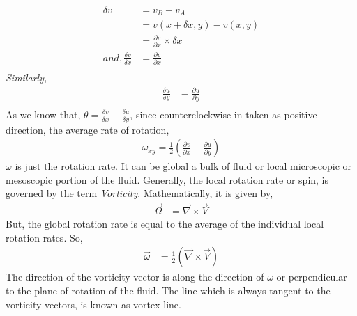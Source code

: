 \documentclass{book}
\begin{document}
\begin{equation*}
\begin{split}
\delta v&=v_B-v_A\\
&=v(x+\delta x,y)-v(x,y)\\
&=\frac{\partial v}{\partial x}\times \delta x\\
and, \frac{\delta v}{\delta x}&=\frac{\partial v}{\partial x}\\
\end{split}
\end{equation*}
\emph{Similarly,}\\
\vspace{0.8cm}
\begin{equation*}
\begin{split}
\frac{\delta u}{\delta y}&=\frac{\partial u}{\partial y}\\
\end{split}
\end{equation*}
As we know that, $\dot{\theta}=\frac{\delta v}{\delta x}-\frac{\delta u}{\delta y}$, since counterclockwise in taken as positive direction, the average rate of rotation,
\begin{equation*}
\begin{split}
 \omega_{xy}=\frac{1}{2}(\frac{\partial v}{\partial x}-\frac{\partial u}{\partial y})
\end{split}
\end{equation*}
$\omega$ is just the rotation rate. It can be global \textemdash a bulk of fluid or local \textemdash microscopic or mesoscopic portion of the fluid. Generally, the local rotation rate or spin, is governed by the term \emph{Vorticity}.
Mathematically, it is given by, 
\begin{equation}
\begin{split}
\vec{\Omega}&=\vec{\nabla}\times \vec{V}
\end{split}
\end{equation}
But, the global rotation rate is equal to the average of the individual local rotation rates. So, 
\begin{equation}
\begin{split}
\vec{\omega}&=\frac{1}{2}(\vec{\nabla}\times \vec{V})
\end{split}
\end{equation}
The direction of the vorticity vector is along the direction of $\omega$ or perpendicular to the plane of rotation of the fluid. The line which is always tangent to the vorticity vectors, is known as vortex line.\\
\end{document}
